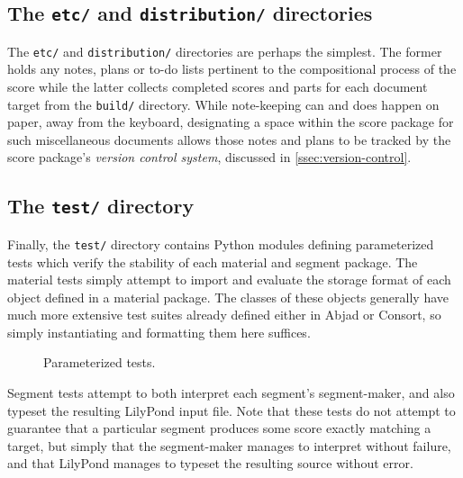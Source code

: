 \subsection{The \texttt{etc/} and \texttt{distribution/} directories}
\label{ssec:the-etc-and-distribution-directories}

The \texttt{etc/} and \texttt{distribution/} directories are perhaps the
simplest. The former holds any notes, plans or to-do lists pertinent to the
compositional process of the score while the latter collects completed scores
and parts for each document target from the \texttt{build/} directory. While
note-keeping can and does happen on paper, away from the keyboard, designating
a space within the score package for such miscellaneous documents allows those
notes and plans to be tracked by the score package's \emph{version control
system}, discussed in \autoref{ssec:version-control}.

\subsection{The \texttt{test/} directory}
\label{ssec:the-test-directory}

Finally, the \texttt{test/} directory contains Python modules defining
parameterized tests which verify the stability of each material and segment
package. The material tests simply attempt to import and evaluate the storage
format of each object defined in a material package. The classes of these
objects generally have much more extensive test suites already defined either
in Abjad or Consort, so simply instantiating and formatting them here suffices.

\begin{figure}[h!]
\begin{singlespacing}
\vspace{-0.5\baselineskip}
\end{singlespacing}
\caption{Parameterized tests.}
\end{figure}

Segment tests attempt to both interpret each segment's segment-maker, and also
typeset the resulting LilyPond input file. Note that these tests do not attempt
to guarantee that a particular segment produces some score exactly matching a
target, but simply that the segment-maker manages to interpret without failure,
and that LilyPond manages to typeset the resulting source without error.

